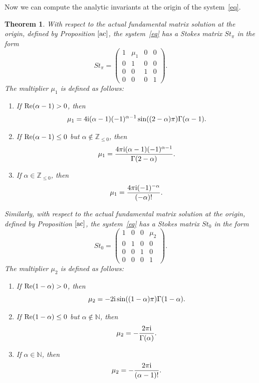 \documentclass[10pt,a4paper]{amsart}
\numberwithin{equation}{section}
\newtheorem{Theorem}{Theorem}[section]
\begin{document}
 Now we can compute the analytic invariants at the origin of the system~\eqref{eq}.

 \begin{Theorem}%
 With respect to the actual fundamental matrix solution at the origin, defined by Proposition $\ref{ac}$, the system~\eqref{eq} has a
 Stokes matrix $St_{\pi}$ in the form
 \[
 St_{\pi}=\begin{pmatrix}
 1 & \mu_1 & 0 & 0\\
 0 & 1 & 0 & 0\\
 0 & 0 & 1 & 0\\
 0 & 0 & 0 & 1
 \end{pmatrix} .
 \]
 The multiplier $\mu_1$ is defined as follows:
 \begin{enumerate}
 \itemsep=0pt 	
 \item[$1.$]
 If ${\rm Re} (\alpha-1) > 0$, then
 \[
 \mu_1= 4 {\rm i} (\alpha-1) (-1)^{\alpha-1} \sin((2-\alpha) \pi) \Gamma(\alpha-1) .
 \]
 	
 \item[$2.$]
 If ${\rm Re} (\alpha-1) \leq 0$ but $\alpha\notin\mathbb{Z}_{\leq 0}$, then
 \[
 \mu_1=
 \frac{4 \pi {\rm i} (\alpha-1) (-1)^{\alpha-1}}{\Gamma(2-\alpha)} .
 \]
 	
 \item[$3.$]
 If $\alpha\in\mathbb{Z}_{\leq 0}$, then
 \[
 \mu_1=\frac{4 \pi {\rm i} (-1)^{-\alpha}}{(-\alpha)!} .
 \]
 \end{enumerate}

 Similarly, with respect to the actual fundamental matrix solution at the origin, defined by Proposition $\ref{ac}$, the system~\eqref{eq} has a
 Stokes matrix $St_0$ in the form
 \[
 St_0=\begin{pmatrix}
 1 & 0 & 0 & \mu_2\\
 0 & 1 & 0 & 0\\
 0 & 0 & 1 & 0\\
 0 & 0 & 0 & 1
 \end{pmatrix} .
 \]
 The multiplier $\mu_2$ is defined as follows:
 \begin{enumerate}
 \itemsep=0pt
 	\item[$1.$]
 	If ${\rm Re} (1-\alpha) > 0$, then
 	\[
 	\mu_2=
 	 -2 {\rm i} \sin((1-\alpha) \pi) \Gamma(1-\alpha) .
 	\]
 	
 	\item[$2.$]
 	If ${\rm Re} (1-\alpha) \leq 0$ but $\alpha\notin\mathbb{N}$, then
 	\[
 	\mu_2=-\frac{2 \pi {\rm i}}{\Gamma(\alpha)} .
 	\]
 	
 	\item[$3.$]
 	If $\alpha\in\mathbb{N}$, then
 	\[
 	\mu_2=-\frac{2 \pi {\rm i}}{(\alpha-1)!} .
 	\]
 \end{enumerate}
 \end{Theorem}
\end{document}
